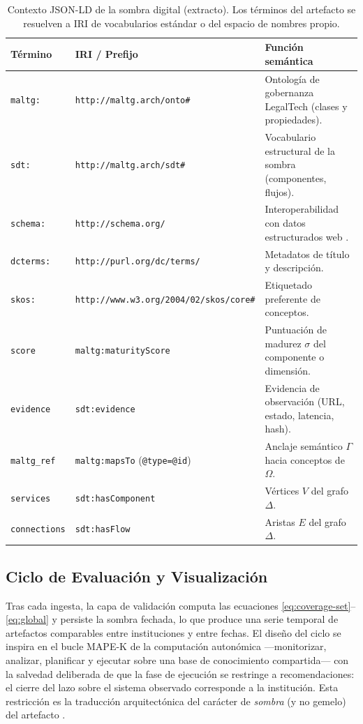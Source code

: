 \documentclass[computers,article,submit,pdftex,moreauthors]{Definitions/mdpi}
\begin{document}
\begin{table}[H]
\caption{Contexto JSON-LD de la sombra digital (extracto). Los términos del artefacto se resuelven a IRI de vocabularios estándar o del espacio de nombres propio.}
\label{tab:context}
\begin{tabularx}{\textwidth}{llX}
\toprule
\textbf{Término} & \textbf{IRI / Prefijo} & \textbf{Función semántica}\\
\midrule
\texttt{maltg:} & \texttt{http://maltg.arch/onto\#} & Ontología de gobernanza LegalTech (clases y propiedades).\\
\texttt{sdt:} & \texttt{http://maltg.arch/sdt\#} & Vocabulario estructural de la sombra (componentes, flujos).\\
\texttt{schema:} & \texttt{http://schema.org/} & Interoperabilidad con datos estructurados web \cite{Guha2016}.\\
\texttt{dcterms:} & \texttt{http://purl.org/dc/terms/} & Metadatos de título y descripción.\\
\texttt{skos:} & \texttt{http://www.w3.org/2004/02/skos/core\#} & Etiquetado preferente de conceptos.\\
\texttt{score} & \texttt{maltg:maturityScore} & Puntuación de madurez $\sigma$ del componente o dimensión.\\
\texttt{evidence} & \texttt{sdt:evidence} & Evidencia de observación (URL, estado, latencia, hash).\\
\texttt{maltg\_ref} & \texttt{maltg:mapsTo} (\texttt{@type=@id}) & Anclaje semántico $\Gamma$ hacia conceptos de $\Omega$.\\
\texttt{services} & \texttt{sdt:hasComponent} & Vértices $V$ del grafo $\Delta$.\\
\texttt{connections} & \texttt{sdt:hasFlow} & Aristas $E$ del grafo $\Delta$.\\
\bottomrule
\end{tabularx}
\end{table}

\subsection{Ciclo de Evaluación y Visualización}
Tras cada ingesta, la capa de validación computa las ecuaciones \eqref{eq:coverage-set}--\eqref{eq:global} y persiste la sombra fechada, lo que produce una serie temporal de artefactos comparables entre instituciones y entre fechas. El diseño del ciclo se inspira en el bucle MAPE-K de la computación autonómica \cite{Kephart2003} —monitorizar, analizar, planificar y ejecutar sobre una base de conocimiento compartida— con la salvedad deliberada de que la fase de ejecución se restringe a recomendaciones: el cierre del lazo sobre el sistema observado corresponde a la institución. Esta restricción es la traducción arquitectónica del carácter de \emph{sombra} (y no gemelo) del artefacto \cite{Kritzinger2018,Sepasgozar2021}.
\end{document}
